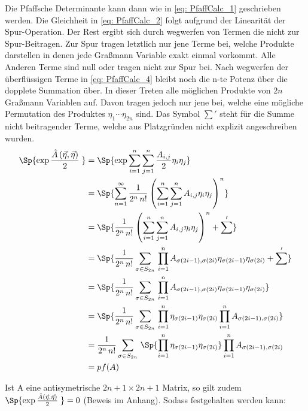 \noindent Die Pfaffsche Determinante kann dann wie in \eqref{eq: PfaffCalc_1} geschrieben werden. Die Gleichheit in \eqref{eq: PfaffCalc_2} folgt aufgrund der Linearität der Spur-Operation. Der Rest ergibt sich durch wegwerfen von Termen die nicht zur Spur-Beitragen. Zur Spur tragen letztlich nur jene Terme bei, welche Produkte darstellen in denen jede Graßmann Variable exakt einmal vorkommt. Alle Anderen Terme sind null oder tragen nicht zur Spur bei. Nach wegwerfen der überflüssigen Terme in \eqref{eq: PfaffCalc_4} bleibt noch die n-te Potenz über die dopplete Summation über. In dieser Treten alle möglichen Produkte von $2n$ Graßmann Variablen auf. Davon tragen jedoch nur jene bei, welche eine mögliche Permutation des Produktes $ \eta_1 \cdots \eta_{2n} $ sind. Das Symbol $\sum '$ steht für die Summe nicht beitragender Terme, welche aus Platzgründen nicht explizit angeschreiben wurden. 
\begin{align}
\Sp{\exp{\frac{\hat{A}\left(\vec{\eta}, \vec{\eta}\right)}{2}\;}} 
& = \Sp{ \exp{\sum_{i=1}^n \sum_{j=1}^n \frac{A_{i,j}}{2} \eta_i \eta_j }}\\
&= \Sp{ \sum_{n=1}^{\infty} \frac{1}{2^n\,n!} \left(\sum_{i=1}^n \sum_{j=1}^n A_{i,j} \eta_i \eta_j \right)^n} \nonumber\\
&= \Sp{ \frac{1}{2^n\,n!} \left(\sum_{i=1}^n \sum_{j=1}^n A_{i,j} \eta_i \eta_j \right)^n  + \sum '} \label{eq: PfaffCalc_4}\\
&= \Sp{ \frac{1}{2^n\,n!} \sum_{\sigma \in S_{2n}} \, \prod_{i=1}^n  A_{\sigma(2i-1),\sigma(2i)}\eta_{\sigma(2i-1)}\eta_{\sigma(2i)} + \sum '} \label{eq: PfaffCalc_3}\\
&= \Sp{ \frac{1}{2^n\,n!} \sum_{\sigma \in S_{2n}} \, \prod_{i=1}^n A_{\sigma(2i-1),\sigma(2i)}\eta_{\sigma(2i-1)}\eta_{\sigma(2i)}} \nonumber \\
&= \Sp{ \frac{1}{2^n\,n!} \sum_{\sigma \in S_{2n}} \, \prod_{i=1}^n \eta_{\sigma(2i-1)}\eta_{\sigma(2i)} \prod_{i=1}^n A_{\sigma(2i-1),\sigma(2i)} } \label{eq: PfaffCalc_2} \\
&= \frac{1}{2^n\,n!} \sum_{\sigma \in S_{2n}} \,\Sp{ \prod_{i=1}^n  \eta_{\sigma(2i-1)}\eta_{\sigma(2i)} } \prod_{i=1}^n A_{\sigma(2i-1),\sigma(2i)} \label{eq: PfaffCalc_1} \\
&= pf(A) \nonumber
\end{align}

\noindent Ist A eine antisymetrische $2n+1 \times 2n+1$ Matrix, so gilt zudem $\Sp{\exp{\frac{\hat{A}\left(\vec{\eta}, \vec{\eta}\right)}{2}\;}}  = 0$ (Beweis im Anhang). Sodass festgehalten werden kann:

